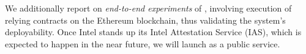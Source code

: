We additionally report on {\em end-to-end experiments} of \tc, involving execution of relying contracts on the Ethereum blockchain, thus validating the system's deployability. Once Intel stands up its Intel Attestation Service (IAS), which is expected to happen in the near future, we will launch \tc as a public service. 





